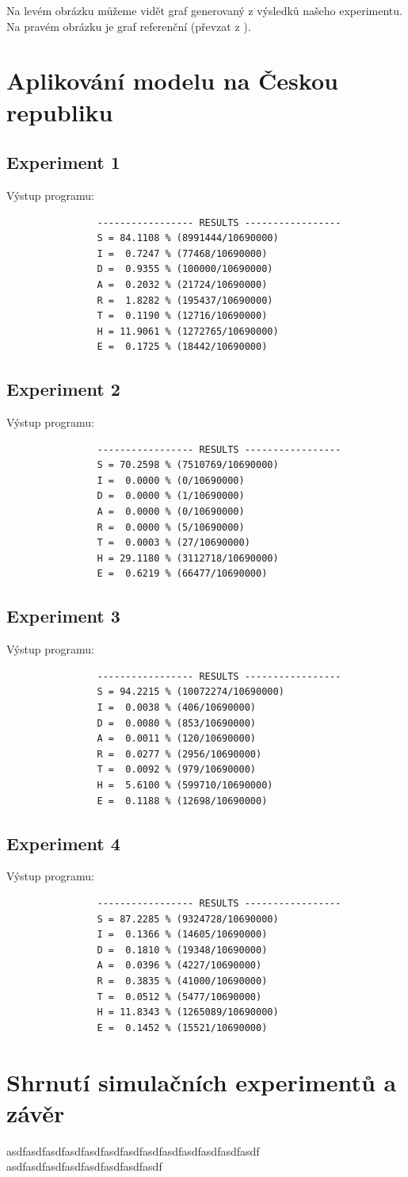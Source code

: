\documentclass[a4paper,11pt]{article}
\begin{document}
			Na levém obrázku můžeme vidět graf generovaný z výsledků našeho experimentu. Na pravém obrázku je graf referenční (převzat z \cite{source}). 
		
	\section{Aplikování modelu na Českou republiku}
		\subsection{Experiment 1}
			Výstup programu:
			\begin{verbatim}
				----------------- RESULTS -----------------
				S = 84.1108 % (8991444/10690000)
				I =  0.7247 % (77468/10690000)
				D =  0.9355 % (100000/10690000)
				A =  0.2032 % (21724/10690000)
				R =  1.8282 % (195437/10690000)
				T =  0.1190 % (12716/10690000)
				H = 11.9061 % (1272765/10690000)
				E =  0.1725 % (18442/10690000)
			\end{verbatim}
		\subsection{Experiment 2}
			Výstup programu:
			\begin{verbatim}
				----------------- RESULTS -----------------
				S = 70.2598 % (7510769/10690000)
				I =  0.0000 % (0/10690000)
				D =  0.0000 % (1/10690000)
				A =  0.0000 % (0/10690000)
				R =  0.0000 % (5/10690000)
				T =  0.0003 % (27/10690000)
				H = 29.1180 % (3112718/10690000)
				E =  0.6219 % (66477/10690000)
			\end{verbatim}
		\subsection{Experiment 3}
			Výstup programu:
			\begin{verbatim}
				----------------- RESULTS -----------------
				S = 94.2215 % (10072274/10690000)
				I =  0.0038 % (406/10690000)
				D =  0.0080 % (853/10690000)
				A =  0.0011 % (120/10690000)
				R =  0.0277 % (2956/10690000)
				T =  0.0092 % (979/10690000)
				H =  5.6100 % (599710/10690000)
				E =  0.1188 % (12698/10690000)
			\end{verbatim}
		\subsection{Experiment 4}
			Výstup programu:
			\begin{verbatim}
				----------------- RESULTS -----------------
				S = 87.2285 % (9324728/10690000)
				I =  0.1366 % (14605/10690000)
				D =  0.1810 % (19348/10690000)
				A =  0.0396 % (4227/10690000)
				R =  0.3835 % (41000/10690000)
				T =  0.0512 % (5477/10690000)
				H = 11.8343 % (1265089/10690000)
				E =  0.1452 % (15521/10690000)
			\end{verbatim}
	\section{Shrnutí simulačních experimentů a závěr}
		asdfasdfasdfasdfasdfasdfasdfasdfasdfasdfasdfasdfasdf
		asdfasdfasdfasdfasdfasdfasdfasdf

	\newpage
	
	\renewcommand{\refname}{Literatura}
	
\end{document}
